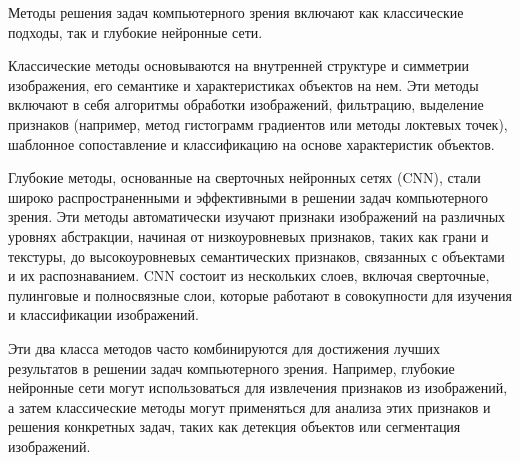
Методы решения задач компьютерного зрения включают как классические подходы, так и глубокие нейронные сети.

Классические методы основываются на внутренней структуре и симметрии изображения, его семантике и характеристиках объектов на нем. Эти методы включают в себя алгоритмы обработки изображений, фильтрацию, выделение признаков (например, метод гистограмм градиентов или методы локтевых точек), шаблонное сопоставление и классификацию на основе характеристик объектов.

Глубокие методы, основанные на сверточных нейронных сетях (CNN), стали широко распространенными и эффективными в решении задач компьютерного зрения. Эти методы автоматически изучают признаки изображений на различных уровнях абстракции, начиная от низкоуровневых признаков, таких как грани и текстуры, до высокоуровневых семантических признаков, связанных с объектами и их распознаванием. CNN состоит из нескольких слоев, включая сверточные, пулинговые и полносвязные слои, которые работают в совокупности для изучения и классификации изображений.

Эти два класса методов часто комбинируются для достижения лучших результатов в решении задач компьютерного зрения. Например, глубокие нейронные сети могут использоваться для извлечения признаков из изображений, а затем классические методы могут применяться для анализа этих признаков и решения конкретных задач, таких как детекция объектов или сегментация изображений.
